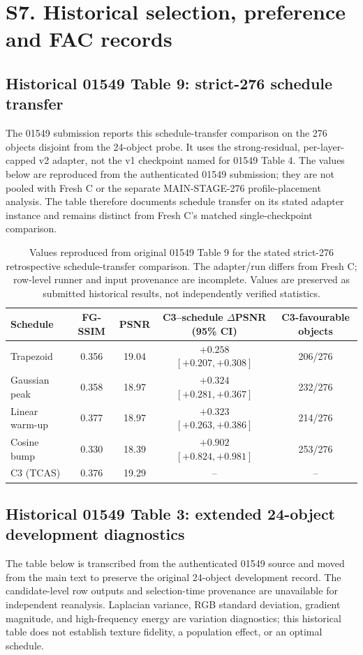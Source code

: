 \documentclass[11pt]{article}
\begin{document}
\FloatBarrier
\section*{S7. Historical selection, preference and FAC records}
\label{supp:group7}

\subsection*{Historical 01549 Table 9: strict-276 schedule transfer}
The 01549 submission reports this schedule-transfer comparison on the 276 objects disjoint from the 24-object probe. It uses the strong-residual, per-layer-capped v2 adapter, not the v1 checkpoint named for 01549 Table 4. The values below are reproduced from the authenticated 01549 submission; they are not pooled with Fresh C or the separate MAIN-STAGE-276 profile-placement analysis. The table therefore documents schedule transfer on its stated adapter instance and remains distinct from Fresh C's matched single-checkpoint comparison.

\begin{table}[ht]
\centering\small
\caption{Values reproduced from original 01549 Table 9 for the stated strict-276 retrospective schedule-transfer comparison. The adapter/run differs from Fresh C; row-level runner and input provenance are incomplete. Values are preserved as submitted historical results, not independently verified statistics.}
\label{tab:historical-table9}
\begin{tabular}{lcccc}
\toprule
Schedule & FG-SSIM & PSNR & C3--schedule $\Delta$PSNR (95\% CI) & C3-favourable objects \\
\midrule
Trapezoid & 0.356 & 19.04 & $+0.258$ $[+0.207,+0.308]$ & 206/276 \\
Gaussian peak & 0.358 & 18.97 & $+0.324$ $[+0.281,+0.367]$ & 232/276 \\
Linear warm-up & 0.377 & 18.97 & $+0.323$ $[+0.263,+0.386]$ & 214/276 \\
Cosine bump & 0.330 & 18.39 & $+0.902$ $[+0.824,+0.981]$ & 253/276 \\
C3 (TCAS) & 0.376 & 19.29 & -- & -- \\
\bottomrule
\end{tabular}
\end{table}

\subsection*{Historical 01549 Table 3: extended 24-object development diagnostics}
The table below is transcribed from the authenticated 01549 source and moved from the main text to preserve the original 24-object development record. The candidate-level row outputs and selection-time provenance are unavailable for independent reanalysis. Laplacian variance, RGB standard deviation, gradient magnitude, and high-frequency energy are variation diagnostics; this historical table does not establish texture fidelity, a population effect, or an optimal schedule.
\end{document}
